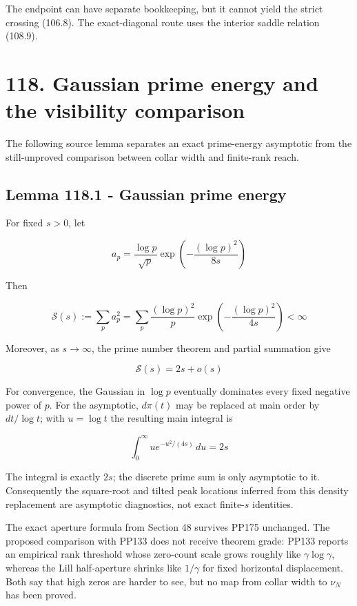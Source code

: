 \documentclass[
  11pt,
]{book}
\begin{document}
The endpoint can have separate bookkeeping, but it cannot yield the
strict crossing (106.8). The exact-diagonal route uses the interior
saddle relation (108.9).

\section{118. Gaussian prime energy and the visibility
comparison}\label{gaussian-prime-energy-and-the-visibility-comparison}

The following source lemma separates an exact prime-energy asymptotic
from the still-unproved comparison between collar width and finite-rank
reach.

\subsection{Lemma 118.1 - Gaussian prime
energy}\label{lemma-118.1---gaussian-prime-energy}

For fixed \(s>0\), let

\[
a_p=\frac{\log p}{\sqrt p}
\exp\!\left(-\frac{(\log p)^2}{8s}\right)
\]

Then

\[
\boxed{
\mathcal S(s):=\sum_p a_p^2
=\sum_p\frac{(\log p)^2}{p}
\exp\!\left(-\frac{(\log p)^2}{4s}\right)<\infty
}
\tag{118.1}
\]

Moreover, as \(s\to\infty\), the prime number theorem and partial
summation give

\[
\boxed{\mathcal S(s)=2s+o(s)}
\tag{118.2}
\]

For convergence, the Gaussian in \(\log p\) eventually dominates every
fixed negative power of \(p\). For the asymptotic, \(d\pi(t)\) may be
replaced at main order by \(dt/\log t\); with \(u=\log t\) the resulting
main integral is

\[
\int_0^\infty u e^{-u^2/(4s)}\,du=2s
\]

The integral is exactly \(2s\); the discrete prime sum is only
asymptotic to it. Consequently the square-root and tilted peak locations
inferred from this density replacement are asymptotic diagnostics, not
exact finite-\(s\) identities.

The exact aperture formula from Section 48 survives PP175 unchanged. The
proposed comparison with PP133 does not receive theorem grade: PP133
reports an empirical rank threshold whose zero-count scale grows roughly
like \(\gamma\log\gamma\), whereas the Lill half-aperture shrinks like
\(1/\gamma\) for fixed horizontal displacement. Both say that high zeros
are harder to see, but no map from collar width to \(\nu_N\) has been
proved.
\end{document}
